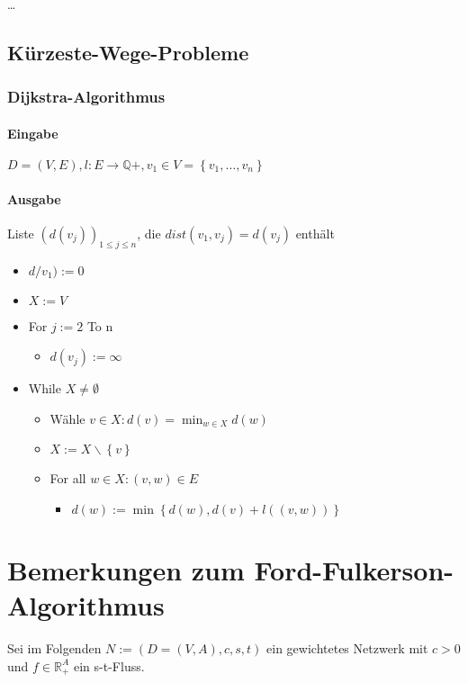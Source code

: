 \documentclass[10pt]{scrbook}
\begin{document}
\begin{Bsp}
\ldots
\end{Bsp}

\subsection{Kürzeste-Wege-Probleme}

\subsubsection{Dijkstra-Algorithmus}

\paragraph{Eingabe} $D=(V, E), l: E \rightarrow \mathbb{Q}+, v_1 \in V=\left\{v_1, \ldots, v_n\right\}$
\paragraph{Ausgabe} Liste $(d(v_j))_{1\leq j\leq n}$, die $dist(v_1, v_j) = d(v_j)$ enthält
\begin{itemize}
\item $d/v_1):=0$
\item $X:=V$
\item For $j:=2$ To n
\begin{itemize}
\item $d(v_j):=\infty$
\end{itemize}
\item While $X\neq \emptyset$
\begin{itemize}
\item Wähle $v\in X: d(v)=\min_{w\in X} d(w)$
\item $X:=X\backslash \left\{v\right\}$
\item For all $w\in X: (v, w)\in E$
\begin{itemize}
\item $d(w):=\min\left\{d(w), d(v)+l((v, w))\right\}$
\end{itemize}
\end{itemize}
\end{itemize}

\section{Bemerkungen zum Ford-Fulkerson-Algorithmus}

\begin{Bem}
Sei im Folgenden $N:=(D=(V, A), c, s, t)$ ein gewichtetes Netzwerk mit $c>0$ und $f\in\mathbb{R}_+^A$ ein s-t-Fluss.
\end{Bem}
\end{document}
